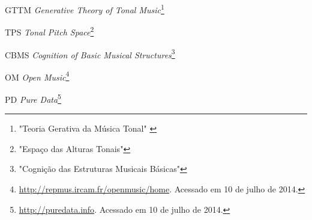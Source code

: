 \documentclass[
	12pt,				%
	openright,			%
	twoside,			%
	a4paper,			%
	english,			%
	french,				%
	spanish,			%
	brazil				%
	]{abntex2}
\begin{document}

\listoffigures*
\cleardoublepage


\begin{siglas}
  \item[GTTM] \textit{Generative Theory of Tonal Music}\footnote{ "Teoria Gerativa da Música Tonal"      \cite{lerdahl1983generative} }
  \item[TPS] \textit{Tonal Pitch Space}\footnote{ "Espaço das Alturas Tonais"\cite{lerdahl1988tps} }
  \item[CBMS] \textit{Cognition of Basic Musical Structures}\footnote{ "Cognição das Estruturas Musicais Básicas"\cite{temperley2001cognition} }
  \item[OM] \textit{Open Music}\footnote{ \url{http://repmus.ircam.fr/openmusic/home}. Acessado em 10 de julho de 2014. }
  \item[PD] \textit{Pure Data}\footnote{ \url{http://puredata.info}. Acessado em 10 de julho de 2014. }
\end{siglas}
\end{document}

